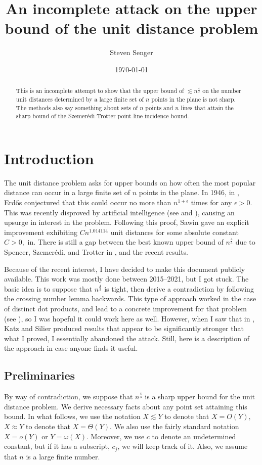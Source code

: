 \documentclass[12pt]{article}
\title{An incomplete attack on the upper bound of the unit distance problem}
\date{\today}
\author{Steven Senger}
\begin{document}
\maketitle
\begin{abstract}
This is an incomplete attempt to show that the upper bound of $\lesssim n^\frac{4}{3}$ on the number unit distances determined by a large finite set of $n$ points in the plane is not sharp. The methods also say something about sets of $n$ points and $n$ lines that attain the sharp bound of the Szemer\'edi-Trotter point-line incidence bound.
\end{abstract}

\section{Introduction}
The unit distance problem asks for upper bounds on how often the most popular distance can occur in a large finite set of $n$ points in the plane. In 1946, in \cite{Erd46}, Erd\H os conjectured that this could occur no more than $n^{1+\epsilon}$ times for any $\epsilon > 0.$ This was recently disproved by artificial intelligence (see \cite{AI} and \cite{AlonEtAl}), causing an upsurge in interest in the problem. Following this proof, Sawin gave an explicit improvement exhibiting $Cn^{1.014114}$ unit distances for some absolute constant $C>0,$ in\cite{Sawin}. There is still a gap between the best known upper bound of $n^\frac{4}{3}$ due to Spencer, Szemer\'edi, and Trotter in \cite{SST84}, and the recent results.

Because of the recent interest, I have decided to make this document publicly available. This work was mostly done between 2015--2021, but I got stuck. The basic idea is to suppose that $n^\frac{4}{3}$ is tight, then derive a contradiction by following the crossing number lemma backwards. This type of approach worked in the case of distinct dot products, and lead to a concrete improvement for that problem (see \cite{HRS}), so I was hopeful it could work here as well. However, when I saw that in \cite{KS}, Katz and Silier produced results that appear to be significantly stronger that what I proved, I essentially abandoned the attack. Still, here is a description of the approach in case anyone finds it useful.

\subsection{Preliminaries}
By way of contradiction, we suppose that $n^\frac{4}{3}$ is a sharp upper bound for the unit distance problem. We derive necessary facts about any point set attaining this bound. In what follows, we use the notation $X \lesssim Y$ to denote that $X=O(Y),$ $X\approx Y$ to denote that $X=\Theta(Y).$ We also use the fairly standard notation $X= o(Y)$ or $Y=\omega(X).$ Moreover, we use $c$ to denote an undetermined constant, but if it has a subscript, $c_j$, we will keep track of it. Also, we assume that $n$ is a large finite number.
\end{document}
